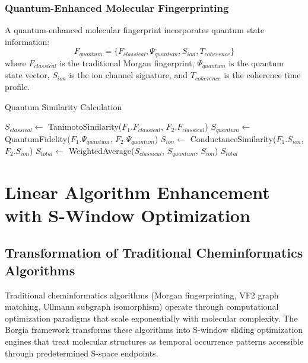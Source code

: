 \documentclass[11pt,a4paper]{article}
\begin{document}
\subsubsection{Quantum-Enhanced Molecular Fingerprinting}

\begin{definition}
A quantum-enhanced molecular fingerprint incorporates quantum state information:
\begin{equation}
F_{quantum} = \{F_{classical}, \Psi_{quantum}, S_{ion}, T_{coherence}\}
\end{equation}
where $F_{classical}$ is the traditional Morgan fingerprint, $\Psi_{quantum}$ is the quantum state vector, $S_{ion}$ is the ion channel signature, and $T_{coherence}$ is the coherence time profile.
\end{definition}

\begin{algorithm}
\caption{Quantum Similarity Calculation}
\begin{algorithmic}
    \State $S_{classical} \leftarrow$ TanimotoSimilarity($F_1.F_{classical}$, $F_2.F_{classical}$)
    \State $S_{quantum} \leftarrow$ QuantumFidelity($F_1.\Psi_{quantum}$, $F_2.\Psi_{quantum}$)
    \State $S_{ion} \leftarrow$ ConductanceSimilarity($F_1.S_{ion}$, $F_2.S_{ion}$)
    \State $S_{total} \leftarrow$ WeightedAverage($S_{classical}$, $S_{quantum}$, $S_{ion}$)
    \State \Return $S_{total}$
\EndProcedure
\end{algorithmic}
\end{algorithm}

\section{Linear Algorithm Enhancement with S-Window Optimization}

\subsection{Transformation of Traditional Cheminformatics Algorithms}

Traditional cheminformatics algorithms (Morgan fingerprinting, VF2 graph matching, Ullmann subgraph isomorphism) operate through computational optimization paradigms that scale exponentially with molecular complexity. The Borgia framework transforms these algorithms into S-window sliding optimization engines that treat molecular structures as temporal occurrence patterns accessible through predetermined S-space endpoints.
\end{document}
